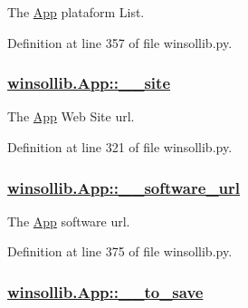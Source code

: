The \hyperlink{classwinsollib_1_1App}{App} plataform List. 



Definition at line 357 of file winsollib.py.\hypertarget{classwinsollib_1_1App_96d35fa04f998f21266d8e26816c3569}{
\subsubsection[\_\-\_\-site]{\setlength{\rightskip}{0pt plus 5cm}\hyperlink{classwinsollib_1_1App_96d35fa04f998f21266d8e26816c3569}{winsollib.App::\_\-\_\-site}}}
\label{classwinsollib_1_1App_96d35fa04f998f21266d8e26816c3569}


The \hyperlink{classwinsollib_1_1App}{App} Web Site url. 



Definition at line 321 of file winsollib.py.\hypertarget{classwinsollib_1_1App_652377c5723ddd9a0df9a1f0ab257bee}{
\subsubsection[\_\-\_\-software\_\-url]{\setlength{\rightskip}{0pt plus 5cm}\hyperlink{classwinsollib_1_1App_652377c5723ddd9a0df9a1f0ab257bee}{winsollib.App::\_\-\_\-software\_\-url}}}
\label{classwinsollib_1_1App_652377c5723ddd9a0df9a1f0ab257bee}


The \hyperlink{classwinsollib_1_1App}{App} software url. 



Definition at line 375 of file winsollib.py.\hypertarget{classwinsollib_1_1App_1b9a7516516f0040a2f374609d7ecfc6}{
\subsubsection[\_\-\_\-to\_\-save]{\setlength{\rightskip}{0pt plus 5cm}\hyperlink{classwinsollib_1_1App_1b9a7516516f0040a2f374609d7ecfc6}{winsollib.App::\_\-\_\-to\_\-save}}}
\label{classwinsollib_1_1App_1b9a7516516f0040a2f374609d7ecfc6}


